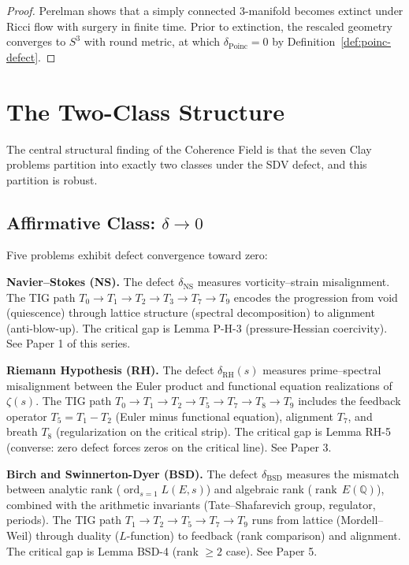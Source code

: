 \documentclass[11pt]{article}
\DeclareMathOperator{\rank}{rank}
\DeclareMathOperator{\ord}{ord}
\begin{document}
\begin{proof}
Perelman \cite{Per3} shows that a simply connected 3-manifold becomes
extinct under Ricci flow with surgery in finite time.  Prior to
extinction, the rescaled geometry converges to $S^3$ with round metric,
at which $\delta_{\mathrm{Poinc}} = 0$ by Definition~\ref{def:poinc-defect}.
\end{proof}

\section{The Two-Class Structure}
\label{sec:two-class}

The central structural finding of the Coherence Field is that
the seven Clay problems partition into exactly two classes under
the SDV defect, and this partition is robust.

\subsection{Affirmative Class: $\delta \to 0$}
\label{subsec:affirm}

Five problems exhibit defect convergence toward zero:

\medskip
\noindent
\textbf{Navier--Stokes (NS).}  The defect $\delta_{\mathrm{NS}}$
measures vorticity--strain misalignment.  The TIG path
$T_0 \to T_1 \to T_2 \to T_3 \to T_7 \to T_9$ encodes the
progression from void (quiescence) through lattice structure
(spectral decomposition) to alignment (anti-blow-up).  The critical
gap is Lemma P-H-3 (pressure-Hessian coercivity).
See Paper 1 of this series.

\medskip
\noindent
\textbf{Riemann Hypothesis (RH).}  The defect
$\delta_{\mathrm{RH}}(s)$ measures prime--spectral misalignment
between the Euler product and functional equation realizations of
$\zeta(s)$.  The TIG path
$T_0 \to T_1 \to T_2 \to T_5 \to T_7 \to T_8 \to T_9$ includes
the feedback operator $T_5 = T_1 - T_2$ (Euler minus functional
equation), alignment $T_7$, and breath $T_8$ (regularization on the
critical strip).  The critical gap is Lemma RH-5 (converse: zero
defect forces zeros on the critical line).  See Paper 3.

\medskip
\noindent
\textbf{Birch and Swinnerton-Dyer (BSD).}  The defect
$\delta_{\mathrm{BSD}}$ measures the mismatch between analytic rank
($\ord_{s=1} L(E,s)$) and algebraic rank ($\rank\, E(\mathbb{Q})$),
combined with the arithmetic invariants (Tate--Shafarevich group,
regulator, periods).  The TIG path $T_1 \to T_2 \to T_5 \to T_7
\to T_9$ runs from lattice (Mordell--Weil) through duality
($L$-function) to feedback (rank comparison) and alignment.  The
critical gap is Lemma BSD-4 (rank $\geq 2$ case).  See Paper 5.
\end{document}
